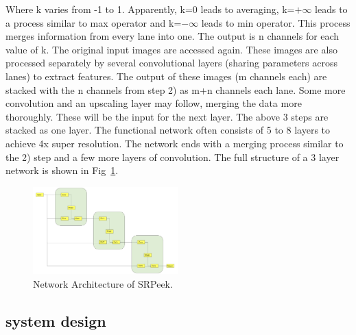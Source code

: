 Where k varies from -1 to 1. Apparently, k=0 leads to averaging, k=${+\infty}$ leads to a process similar to max operator and k=${-\infty}$ leads to min operator. This process merges information from every lane into one. The output is n channels for each value of k. 
	The original input images are accessed again. These images are also processed separately by several convolutional layers (sharing parameters across lanes) to extract features. The output of these images (m channels each) are stacked with the n channels from step 2) as m+n channels each lane. Some more convolution and an upscaling layer may follow, merging the data more thoroughly. These will be the input for the next layer.
The above 3 steps are stacked as one layer. The functional network often consists of 5 to 8 layers to achieve 4x super resolution. The network ends with a merging process similar to the 2) step and a few more layers of convolution. The full structure of a 3 layer network is shown in Fig~\ref{fig-system}.

\begin{figure}
 \centering
    \includegraphics[width=0.5\textwidth]{./pic/design.pdf}
    \caption{Network Architecture of SRPeek.}
    \label{fig-system}
\end{figure}

\subsection{system design}


